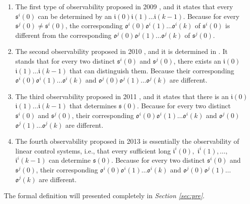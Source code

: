 \begin{enumerate}
	\item The first type of observability proposed in 2009 \cite{cheng2009controllability}, and it states that every $\mathfrak{s}^{i}(0)$ can be determined by an $\mathfrak{i}(0)$$\mathfrak{i}(1)\ldots$$\mathfrak{i}(k-1)$. Because for every $\mathfrak{s}^{j}(0)\ne$$\mathfrak{s}^{i}(0)$, the corresponding $\mathfrak{o}^{i}(0)$$\mathfrak{o}^{i}(1)\ldots$$\mathfrak{o}^{i}(k)$ of $\mathfrak{s}^{i}(0)$ is different from the corresponding $\mathfrak{o}^{j}(0)$$\mathfrak{o}^{j}(1)\ldots$$\mathfrak{o}^{j}(k)$ of $\mathfrak{s}^{j}(0)$. %
	\item 
	The second observability proposed in 2010 \cite{Zhao2010Input}, and it is determined in \cite{Li2015Controllability}. It stands that for every two distinct $\mathfrak{s}^{i}(0)$ and $\mathfrak{s}^{j}(0)$, there exists an $\mathfrak{i}(0)$$\mathfrak{i}(1)\ldots$$\mathfrak{i}(k-1)$ that can distinguish them. Because their corresponding $\mathfrak{o}^{i}(0)$$\mathfrak{o}^{i}(1)\ldots$$\mathfrak{o}^{i}(k)$ and $\mathfrak{o}^{j}(0)$$\mathfrak{o}^{j}(1)\ldots$$\mathfrak{o}^{j}(k)$ are different. %
	\item The third observability proposed in 2011 \cite{Cheng2011Identification}, and it states that there is an $\mathfrak{i}(0)$$\mathfrak{i}(1)\ldots$$\mathfrak{i}(k-1)$ that determines $\mathfrak{s}(0)$. Because for every two distinct $\mathfrak{s}^{i}(0)$ and $\mathfrak{s}^{j}(0)$, their corresponding $\mathfrak{o}^{i}(0)$$\mathfrak{o}^{i}(1)\ldots$$\mathfrak{o}^{i}(k)$ and $\mathfrak{o}^{j}(0)$$\mathfrak{o}^{j}(1)\ldots$$\mathfrak{o}^{j}(k)$ are different.
	
	\item  The fourth observability proposed in 2013 \cite{Fornasini2013Observability} is essentially the observability of linear control systems, i.e., that every sufficient long $\mathfrak{i}^{i}(0),$ $\mathfrak{i}^{i}(1),\ldots,$ $\mathfrak{i}^{i}(k-1)$ can determine $\mathfrak{s}(0)$. Because for every two distinct $\mathfrak{s}^{i}(0)$ and $\mathfrak{s}^{j}(0)$, their corresponding $\mathfrak{o}^{i}(0)$$\mathfrak{o}^{i}(1)\ldots$$\mathfrak{o}^{i}(k)$ and $\mathfrak{o}^{j}(0)$$\mathfrak{o}^{j}(1)\ldots$$\mathfrak{o}^{j}(k)$ are different. %
\end{enumerate}
 The formal definition will presented completely in {\em Section \ref{sec:pre}}.

